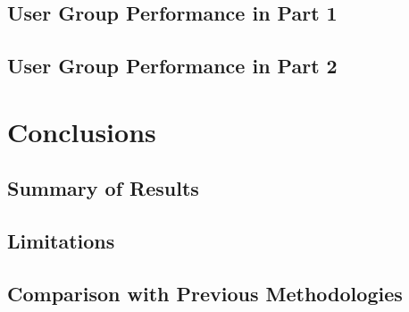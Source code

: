 \subsection{User Group Performance in Part 1}


\subsection{User Group Performance in Part 2}



\section{Conclusions}

\subsection{Summary of Results}

\subsection{Limitations}

\subsection{Comparison with Previous Methodologies}




